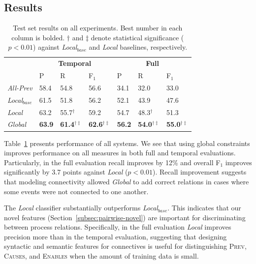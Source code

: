 \subsection{Results} \label{subsec:results}

\begin{table}[t]
\setlength{\tabcolsep}{5pt}
{\footnotesize
\begin{tabular}{  l | l  l  l | l  l  l  }
    & \multicolumn{3}{c|}{\textbf{Temporal}} & \multicolumn{3}{c}{\textbf{Full}} \\
    & P & R & F$_1$ & P & R & F$_1$ \\
\hline
\emph{All-Prev} & 58.4 & 54.8 & 56.6 & 34.1 & 32.0 & 33.0 \\
\emph{Local$_{base}$} & 61.5 & 51.8 & 56.2 &  52.1 & 43.9 & 47.6\\
\emph{Local} & 63.2 & 55.7$^{\dagger}$ & 59.2 & 54.7 & 48.3$^{\dagger}$ & 51.3 \\
\emph{Global} & \textbf{63.9} & \textbf{61.4$^{\dagger\ddagger}$} & \textbf{62.6$^{\dagger\ddagger}$} & \textbf{56.2} & \textbf{54.0$^{\dagger\ddagger}$} & \textbf{55.0$^{\dagger\ddagger}$} 
\end{tabular}}
\caption{Test set results on all experiments. Best number in each column is bolded. $\dagger$ and $\ddagger$ denote statistical significance ($p<0.01$) against \emph{Local$_{base}$} and \emph{Local} baselines, respectively.}
\label{tab:results}
\end{table}

Table~\ref{tab:results} presents performance of all systems. We see that using global constraints improves performance on all measures in both full and temporal evaluations. Particularly, in the full evaluation recall improves by 12\% and overall F$_1$ improves significantly by 3.7 points against \emph{Local} ($p<0.01$). Recall improvement suggests that modeling connectivity allowed \emph{Global} to add correct relations in cases where some events were not connected to one another.

The \emph{Local} classifier substantially outperforms \emph{Local$_{base}$}. This indicates that our novel features (Section~\ref{subsec:pairwise-novel}) are important for discriminating between process relations. Specifically, in the full evaluation \emph{Local} improves precision more than in the temporal evaluation, suggesting that designing syntactic and semantic features for connectives is useful for distinguishing \textsc{Prev}, \textsc{Causes}, and \textsc{Enables} when the amount of training data is small.

